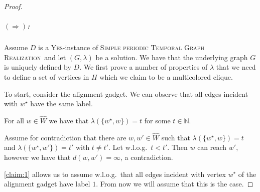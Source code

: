 \documentclass[a4paper,UKenglish,cleveref, autoref, thm-restate]{lipics-v2021}
\newcommand{\deltaExactLong}{\textsc{Simple periodic Temporal Graph Realization}}
\begin{document}
\begin{proof}
\subparagraph{$(\Rightarrow)$:} Assume $D$ is a \textsc{Yes}-instance of \deltaExactLong\ and let $(G,\lambda)$ be a solution. We have that the underlying graph $G$ is uniquely defined by $D$. We first prove a number of properties of $\lambda$ that we need to define a set of vertices in $H$ which we claim to be a multicolored clique.

To start, consider the alignment gadget. We can observe that all edges incident with $w^\star$ have the same label.
\begin{claim}\label{claim:1}
    For all $w\in \hat{W}$ we have that $\lambda(\{w^\star,w\})=t$ for some $t\in\mathbb{N}$.
\end{claim}
\begin{claimproof}
    Assume for contradiction that there are $w,w'\in \hat{W}$ such that $\lambda(\{w^\star,w\})=t$ and $\lambda(\{w^\star,w'\})=t'$ with $t\neq t'$. Let w.l.o.g.\ $t<t'$. Then $w$ can reach $w'$, however we have that $d(w,w')=\infty$, a contradiction.
\end{claimproof}
\cref{claim:1} allows us to assume w.l.o.g.\ that all edges incident with vertex $w^\star$ of the alignment gadget have label $1$. From now we will assume that this is the case.


\end{proof}
\end{document}
